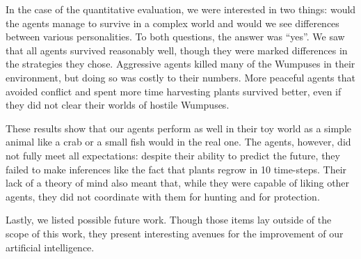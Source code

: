 In the case of the quantitative evaluation, we were interested in two things: would the agents manage to survive in a complex world and would we see differences between various personalities. To both questions, the answer was ``yes''. We saw that all agents survived reasonably well, though they were marked differences in the strategies they chose. Aggressive agents killed many of the Wumpuses in their environment, but doing so was costly to their numbers. More peaceful agents that avoided conflict and spent more time harvesting plants survived better, even if they did not clear their worlds of hostile Wumpuses.

These results show that our agents perform as well in their toy world as a simple animal like a crab or a small fish would in the real one. The agents, however, did not fully meet all expectations: despite their ability to predict the future, they failed to make inferences like the fact that plants regrow in 10 time-steps. Their lack of a theory of mind also meant that, while they were capable of liking other agents, they did not coordinate with them for hunting and for protection.

Lastly, we listed possible future work. Though those items lay outside of the scope of this work, they present interesting avenues for the improvement of our artificial intelligence.
